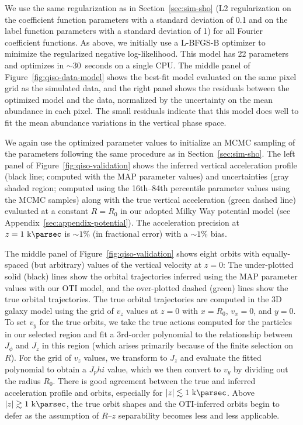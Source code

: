 We use the same regularization as in Section~\ref{sec:sim-sho} (L2 regularization on the
coefficient function parameters with a standard deviation of 0.1 and on the label
function parameters with a standard deviation of 1) for all Fourier coefficient
functions.
As above, we initially use a L-BFGS-B optimizer to minimize the regularized negative
log-likelihood.
This model has 22 parameters and optimizes in $\sim 30$~seconds on a single CPU.
The middle panel of Figure~\ref{fig:qiso-data-model} shows the best-fit model evaluated
on the same pixel grid as the simulated data, and the right panel shows the residuals
between the optimized model and the data, normalized by the uncertainty on the mean
abundance in each pixel.
The small residuals indicate that this model does well to fit the mean abundance
variations in the vertical phase space.

We again use the optimized parameter values to initialize an MCMC sampling of the
parameters following the same procedure as in Section~\ref{sec:sim-sho}.
The left panel of Figure~\ref{fig:qiso-validation} shows the inferred vertical
acceleration profile (black line; computed with the MAP parameter values) and
uncertainties (gray shaded region; computed using the 16th--84th percentile parameter
values using the MCMC samples) along with the true vertical acceleration (green dashed
line) evaluated at a constant $R=R_0$ in our adopted Milky Way potential model (see
Appendix~\ref{sec:appendix-potential}).
The acceleration precision at $z=1~\kpc$ is $\sim 1\%$ (in fractional error) with a
$\sim 1\%$ bias.

The middle panel of Figure~\ref{fig:qiso-validation} shows eight orbits with
equally-spaced (but arbitrary) values of the vertical velocity at $z=0$: The
under-plotted solid (black) lines show the orbital trajectories inferred using the MAP
parameter values with our OTI model, and the over-plotted dashed (green) lines show the
true orbital trajectories.
The true orbital trajectories are computed in the 3D galaxy model using the grid of
$v_z$ values at $z=0$ with $x=R_0$, $v_x=0$, and $y=0$.
To set $v_y$ for the true orbits, we take the true actions computed for the particles in
our selected region and fit a 3rd-order polynomial to the relationship between $J_\phi$
and $J_z$ in this region (which arises primarily because of the finite selection on
$R$).
For the grid of $v_z$ values, we transform to $J_z$ and evaluate the fitted polynomial
to obtain a $J_phi$ value, which we then convert to $v_y$ by dividing out the radius
$R_0$.
There is good agreement between the true and inferred acceleration profile and orbits,
especially for $|z| \lesssim 1~\kpc$.
Above $|z| \gtrsim 1~\kpc$, the true orbit shapes and the OTI-inferred orbits begin to
defer as the assumption of $R$--$z$ separability becomes less and less applicable.

